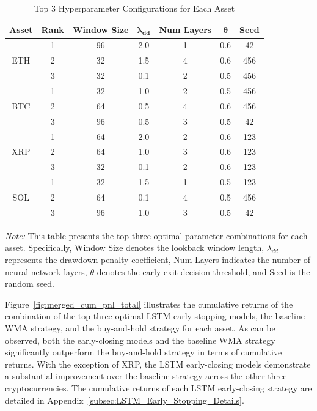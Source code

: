 \documentclass[12pt]{article}
\begin{document}
\begin{table}[H]
  \centering
  \caption{Top 3 Hyperparameter Configurations for Each Asset}
  \label{tab:top3_parameters}
  \small
  \begin{tabular}{ccccccc}
    \toprule
    \textbf{Asset} & \textbf{Rank} & \textbf{Window Size} & $\boldsymbol{\lambda_{dd}}$ & \textbf{Num Layers} & $\boldsymbol{\theta}$ & \textbf{Seed} \\
    \midrule
    \multirow{3}{*}{ETH} 
    & 1 & 96 & 2.0 & 1 & 0.6 & 42 \\
    & 2 & 32 & 1.5 & 4 & 0.6 & 456 \\
    & 3 & 32 & 0.1 & 2 & 0.5 & 456 \\
    \midrule
    \multirow{3}{*}{BTC} 
    & 1 & 32 & 1.0 & 2 & 0.5 & 456 \\
    & 2 & 64 & 0.5 & 4 & 0.6 & 456 \\
    & 3 & 96 & 0.5 & 3 & 0.5 & 42 \\
    \midrule
    \multirow{3}{*}{XRP} 
    & 1 & 64 & 2.0 & 2 & 0.6 & 123 \\
    & 2 & 64 & 1.0 & 3 & 0.6 & 123 \\
    & 3 & 32 & 0.1 & 2 & 0.6 & 123 \\
    \midrule
    \multirow{3}{*}{SOL} 
    & 1 & 32 & 1.5 & 1 & 0.5 & 123 \\
    & 2 & 64 & 0.1 & 4 & 0.5 & 456 \\
    & 3 & 96 & 1.0 & 3 & 0.5 & 42 \\
    \bottomrule
  \end{tabular}
  \vspace{6pt}
  \parbox{0.85\textwidth}{\footnotesize \textit{Note:} This table presents the top three optimal parameter combinations for each asset. Specifically, Window Size denotes the lookback window length, $\lambda_{dd}$ represents the drawdown penalty coefficient, Num Layers indicates the number of neural network layers, $\theta$ denotes the early exit decision threshold, and Seed is the random seed.}
\end{table}

Figure~\ref{fig:merged_cum_pnl_total} illustrates the cumulative returns of the combination of the top three optimal LSTM early-stopping models, the baseline WMA strategy, and the buy-and-hold strategy for each asset. As can be observed, both the early-closing models and the baseline WMA strategy significantly outperform the buy-and-hold strategy in terms of cumulative returns. With the exception of XRP, the LSTM early-closing models demonstrate a substantial improvement over the baseline strategy across the other three cryptocurrencies.
The cumulative returns of each LSTM early-closing strategy are detailed in Appendix~\ref{subsec:LSTM_Early_Stopping_Details}.
\end{document}
